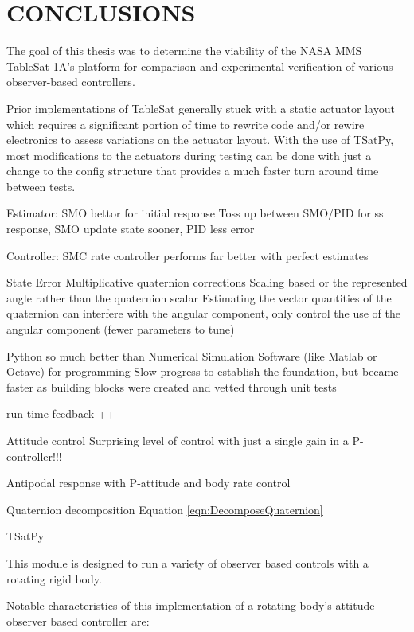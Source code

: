 \chapter{CONCLUSIONS}
\label{chap:Conclusions}

The goal of this thesis was to determine the viability of the NASA MMS TableSat 1A's platform for comparison and experimental verification of various observer-based controllers.


Prior implementations of TableSat generally stuck with a static actuator layout which requires a significant portion of time to rewrite code and/or rewire electronics to assess variations on the actuator layout.  With the use of TSatPy, most modifications to the actuators during testing can be done with just a change to the config structure that provides a much faster turn around time between tests.



Estimator:
  SMO bettor for initial response
  Toss up between SMO/PID for ss response, SMO update state sooner, PID less error

Controller:
  SMC rate controller performs far better with perfect estimates

State Error
  Multiplicative quaternion corrections
  Scaling based or the represented angle rather than the quaternion scalar
  Estimating the vector quantities of the quaternion can interfere with the angular component, only control the use of the angular component (fewer parameters to tune)

Python so much better than Numerical Simulation Software (like Matlab or Octave) for programming
Slow progress to establish the foundation, but became faster as building blocks were created and vetted through unit tests

run-time feedback ++

Attitude control
  Surprising level of control with just a single gain in a P-controller!!!


Antipodal response with P-attitude and body rate control

Quaternion decomposition Equation \ref{eqn:DecomposeQuaternion}



TSatPy

This module is designed to run a variety of observer based controls with a rotating rigid body.

Notable characteristics of this implementation of a rotating body's attitude observer based controller are:

